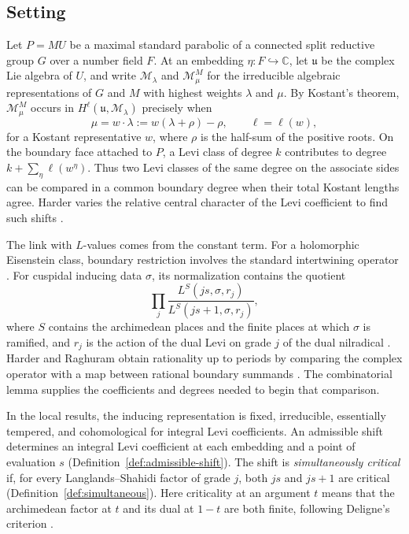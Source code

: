 \documentclass[12pt]{amsart}
\numberwithin{equation}{section}
\theoremstyle{plain}
\theoremstyle{definition}
\theoremstyle{remark}
\newcommand{\C}{\mathbb C}
\newcommand{\cM}{\mathcal M}
\begin{document}
\subsection{Setting}

Let $P=MU$ be a maximal standard parabolic of a connected split reductive group $G$ over a number field $F$. At an embedding $\eta:F\hookrightarrow\C$, let $\mathfrak u$ be the complex Lie algebra of $U$, and write $\cM_\lambda$ and $\cM_\mu^M$ for the irreducible algebraic representations of $G$ and $M$ with highest weights $\lambda$ and $\mu$. By Kostant's theorem, $\cM_\mu^M$ occurs in $H^\ell(\mathfrak u,\cM_\lambda)$ precisely when
\[
  \mu=w\cdot\lambda:=w(\lambda+\rho)-\rho,\qquad \ell=\ell(w),
\]
for a Kostant representative $w$, where $\rho$ is the half-sum of the positive roots. On the boundary face attached to $P$, a Levi class of degree $k$ contributes to degree $k+\sum_\eta\ell(w^\eta)$. Thus two Levi classes of the same degree on the associate sides can be compared in a common boundary degree when their total Kostant lengths agree. Harder varies the relative central character of the Levi coefficient to find such shifts
\cite[\S9.1.4, (9.88)--(9.90)]{HarderChapterNine}.

The link with $L$-values comes from the constant term. For a holomorphic Eisenstein class, boundary restriction involves the standard intertwining operator \cite{Schwermer1983,HarderBook}. For cuspidal inducing data $\sigma$, its normalization contains the quotient
\[
  \prod_j \frac{L^S(js,\sigma,r_j)}{L^S(js+1,\sigma,r_j)},
\]
where $S$ contains the archimedean places and the finite places at which $\sigma$ is ramified, and $r_j$ is the action of the dual Levi on grade $j$ of the dual nilradical \cite{Langlands1971,Shahidi2010}. Harder and Raghuram obtain rationality up to periods by comparing the complex operator with a map between rational boundary summands \cite{HarderRaghuram2020}. The combinatorial lemma supplies the coefficients and degrees needed to begin that comparison.

In the local results, the inducing representation is fixed, irreducible, essentially tempered, and cohomological for integral Levi coefficients. An admissible shift determines an integral Levi coefficient at each embedding and a point of evaluation $s$ (Definition~\ref{def:admissible-shift}). The shift is \emph{simultaneously critical} if, for every Langlands--Shahidi factor of grade $j$, both $js$ and $js+1$ are critical (Definition~\ref{def:simultaneous}). Here criticality at an argument $t$ means that the archimedean factor at $t$ and its dual at $1-t$ are both finite, following Deligne's criterion \cite[Def.~1.3]{Deligne1979}.
\end{document}
